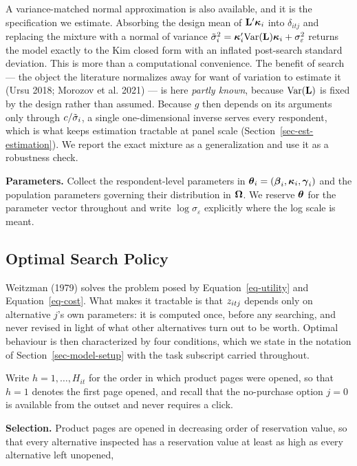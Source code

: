 \documentclass[
  letterpaper,
  DIV=11,
  numbers=noendperiod]{scrartcl}
\begin{document}
A variance-matched normal approximation is also available, and it is the
specification we estimate. Absorbing the design mean of
\(\mathbf{L}'\boldsymbol{\kappa}_i\) into \(\delta_{itj}\) and replacing the mixture with
a normal of variance
\(\tilde\sigma_i^2 = \boldsymbol{\kappa}_i'\mathrm{Var}(\mathbf{L})\boldsymbol{\kappa}_i + \sigma_\varepsilon^2\)
returns the model exactly to the Kim closed form with an inflated
post-search standard deviation. This is more than a computational
convenience. The benefit of search --- the object the literature
normalizes away for want of variation to estimate it (Ursu 2018; Morozov
et al. 2021) --- is here \emph{partly known}, because
\(\mathrm{Var}(\mathbf{L})\) is fixed by the design rather than assumed.
Because \(g\) then depends on its arguments only through
\(c/\tilde\sigma_i\), a single one-dimensional inverse serves every
respondent, which is what keeps estimation tractable at panel scale
(Section~\ref{sec-est-estimation}). We report the exact mixture as a
generalization and use it as a robustness check.

\textbf{Parameters.} Collect the respondent-level parameters in
\(\boldsymbol{\theta}_i = (\boldsymbol{\beta}_i, \boldsymbol{\kappa}_i, \boldsymbol{\gamma}_i)\) and the population
parameters governing their distribution in \(\boldsymbol{\Omega}\). We reserve
\(\boldsymbol{\theta}\) for the parameter vector throughout and write
\(\log \sigma_\varepsilon\) explicitly where the log scale is meant.

\subsection{Optimal Search Policy}\label{sec-model-policy}

Weitzman (1979) solves the problem posed by Equation~\ref{eq-utility}
and Equation~\ref{eq-cost}. What makes it tractable is that
\(z_{itj}\) depends only on alternative \(j\)'s own parameters: it
is computed once, before any searching, and never revised in light of
what other alternatives turn out to be worth. Optimal behaviour is then
characterized by four conditions, which we state in the notation of
Section~\ref{sec-model-setup} with the task subscript carried
throughout.

Write \(h = 1,\dots,H_{it}\) for the order in which product pages were
opened, so that \(h=1\) denotes the first page opened, and recall that
the no-purchase option \(j=0\) is available from the outset and never
requires a click.

\textbf{Selection.} Product pages are opened in decreasing order of
reservation value, so that every alternative inspected has a reservation
value at least as high as every alternative left unopened,
\end{document}

